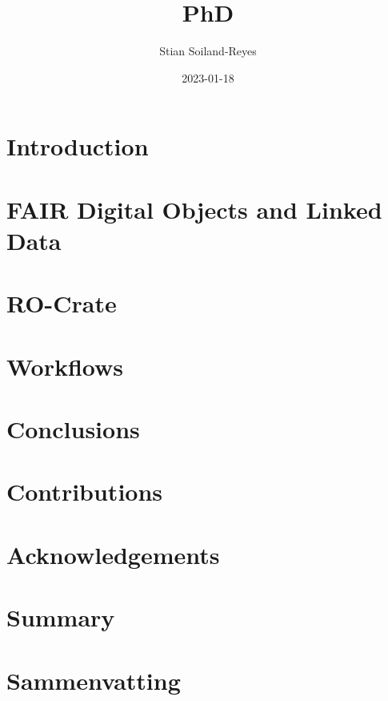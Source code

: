 \documentclass[british,a4paper]{book}
\title{PhD}
\author{Stian Soiland-Reyes}
\date{2023-01-18}
\begin{document}
\frontmatter
\maketitle
{}
\tableofcontents
\clearpage

\listoffigures
\clearpage

\listoftables
\clearpage



\mainmatter
\fancyhead[LO]{\leftmark}


\chapter{Introduction}

\chapter{FAIR Digital Objects and Linked Data}


\chapter{RO-Crate}



\chapter{Workflows}




\chapter{Conclusions}


\chapter{Contributions}

\chapter{Acknowledgements}


\backmatter
{}


\chapter{Summary}

\chapter{Sammenvatting}

\end{document}
